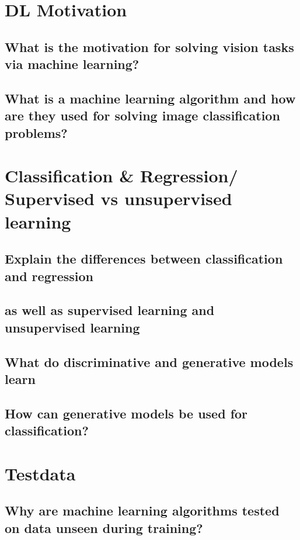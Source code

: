 \section{DL Motivation}

\subsection{What is the motivation for solving vision tasks via machine learning?}

\subsection{What is a machine learning algorithm and how are they used for solving image classification problems?}

\section{Classification \& Regression/ Supervised vs unsupervised learning}

\subsection{Explain the differences between classification and regression }

\subsection{as well as supervised learning and unsupervised learning }

\subsection{What do discriminative and generative models learn }

\subsection{How can generative models be used for classification?}

\section{Testdata}

\subsection{Why are machine learning algorithms tested on data unseen during training?}

